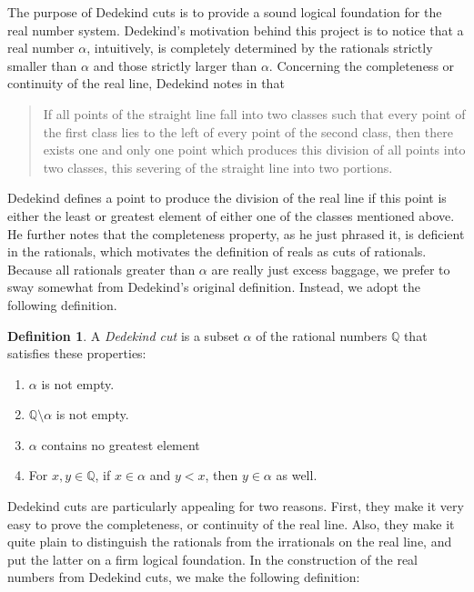 \documentclass[12pt]{article}
\theoremstyle{definition}
\newtheorem*{defn}{Definition}
\theoremstyle{definition}
\theoremstyle{definition}
\newcommand{\QQ}{\mathbb{Q}}
\begin{document}

The purpose of Dedekind cuts is to provide a sound logical foundation for the real number system.
Dedekind's motivation behind this project is to notice that a real number $\alpha$, intuitively,
is completely determined by the rationals strictly smaller than $\alpha$ and those strictly larger than
$\alpha$.  Concerning the completeness or continuity of the real line, Dedekind notes in \cite{Dedekind} that

\begin{quote}
If all points of the straight line fall into two classes such that every point of the first class lies to the
left of every point of the second class, then there exists one and only one point which produces this division
of all points into two classes, this severing of the straight line into two portions.
\end{quote}

Dedekind defines a point to produce the division of the real line if this point is either the
least or greatest element of either one of the classes mentioned above.  He further notes that the completeness 
property, as he just phrased it, is deficient in the rationals, which motivates the definition of reals as cuts 
of rationals.  Because all rationals greater than $\alpha$ are really 
just excess baggage, we prefer to sway
somewhat from Dedekind's original definition.  Instead, we adopt the following definition.

\begin{defn}
A \emph{Dedekind cut} is a subset $\alpha$ of the rational numbers $\QQ$ that satisfies these
properties:

\begin{enumerate}
\item
$\alpha$ is not empty.

\item
$\mathbb{Q} \setminus \alpha$ is not empty.

\item
$\alpha$ contains no greatest element

\item
For $x, y \in \QQ$, if $x \in \alpha$ and $y < x$, then $y \in \alpha$ as well.
\end{enumerate}
\end{defn}

Dedekind cuts are particularly appealing for two reasons.  First, they make it very easy to
prove the completeness, or continuity of the real line.  Also, they make it quite plain to
distinguish the rationals from the irrationals on the real line, and put the latter on a firm
logical foundation.
In the construction of the real numbers from Dedekind cuts, we make the following definition:
\end{document}

